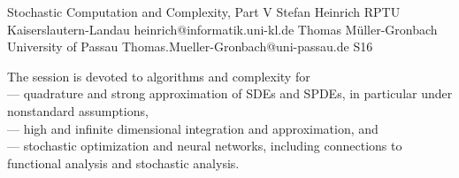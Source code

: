 \begin{session}
 {Stochastic Computation and Complexity, Part V}%
 {Stefan Heinrich}%
 {RPTU Kaiserslautern-Landau}%
 {heinrich@informatik.uni-kl.de}%
 {Thomas M\"uller-Gronbach}%
 {University of Passau}%
 {Thomas.Mueller-Gronbach@uni-passau.de}%
 {S16}%
 {}%

 The session is devoted to algorithms and complexity for\\
 --- quadrature and strong approximation of SDEs and SPDEs, in particular under nonstandard assumptions,\\
 --- high and infinite dimensional integration and approximation, and\\
 --- stochastic optimization and neural networks,
 including connections to functional analysis and stochastic analysis.
\end{session}



\clearpage

